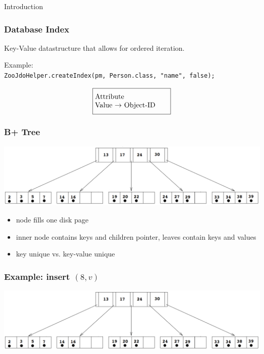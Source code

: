 \documentclass{beamer}
\begin{document}
\begin{section}{Introduction}
\begin{frame}
    \end{frame}
    \begin{frame}
      \frametitle{Database Index}
      \begin{block}{}
          Key-Value datastructure that allows for ordered iteration.
      \end{block}
      \vspace{1em}
      \pause
      Example: \\
      \texttt{ZooJdoHelper.createIndex(pm, Person.class, "name", false);}
      \pause
      \begin{align*}
      \fbox{\parbox[t][3em][c]{0.29\textwidth}{Attribute \\ Value $\rightarrow$ Object-ID} }
      \end{align*}
      \pause
      \begin{center}
      \end{center}
    \end{frame}
    \begin{frame}
      \frametitle{B+ Tree}
      \vspace{-3em}
      \includegraphics[scale=0.2]{images/B+Tree.png}
      \vspace{1em}
      \begin{itemize}
        \item node fills one disk page
        \item inner node contains keys and children pointer, leaves contain keys and values
        \item key unique vs. key-value unique
      \end{itemize}
    \end{frame}
    \begin{frame}
      \frametitle{Example: insert $(8,v)$}
      \vspace{-1em}
      \begin{center}
      \includegraphics[scale=0.17]{images/B+Tree.png}
      \end{center}
      \pause


\end{frame}
\end{section}
\end{document}
